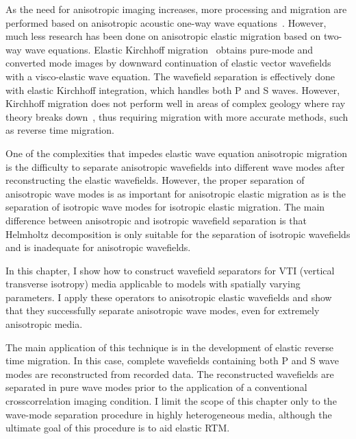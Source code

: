 As the need for anisotropic imaging increases, more processing and
migration are performed based on anisotropic acoustic one-way wave
equations~\cite[]{alkhalifah:623,GEO65-04-12391250,shan:2367,
shan:104,fletcher:WCA179,fowler:S11}.
However, much less research has been done on anisotropic elastic
migration based on two-way wave equations. Elastic Kirchhoff
migration~\cite[]{hokstad:861} obtains pure-mode and converted mode
images by downward continuation of elastic vector wavefields with a
visco-elastic wave equation. The wavefield separation is effectively
done with elastic Kirchhoff integration, which handles both P and S
waves.  However, Kirchhoff migration does not perform well in areas of
complex geology where ray theory breaks
down~\cite[]{GEO66-05-16221640}, thus requiring migration with more
accurate methods, such as reverse time migration.



One of the complexities that impedes elastic wave equation anisotropic
migration is the difficulty to separate anisotropic wavefields into
different wave modes after reconstructing the elastic
wavefields. However, the proper separation of anisotropic wave modes
is as important for anisotropic elastic migration as is the separation
of isotropic wave modes for isotropic elastic migration. The main
difference between anisotropic and isotropic wavefield separation is
that Helmholtz decomposition is only suitable for the separation of
isotropic wavefields and is inadequate for anisotropic wavefields.

In this chapter, I show how to construct wavefield separators for VTI
(vertical transverse isotropy) media applicable to models with
spatially varying parameters.  I apply these operators to anisotropic
elastic wavefields and show that they successfully separate
anisotropic wave modes, even for extremely anisotropic media.

The main application of this technique is in the development of
elastic reverse time migration. In this case, complete wavefields
containing both P and S wave modes are reconstructed from recorded
data. The reconstructed wavefields are separated in pure wave modes
prior to the application of a conventional crosscorrelation imaging
condition. I limit the scope of this chapter only to the wave-mode
separation procedure in highly heterogeneous media, although the
ultimate goal of this procedure is to aid elastic RTM.
